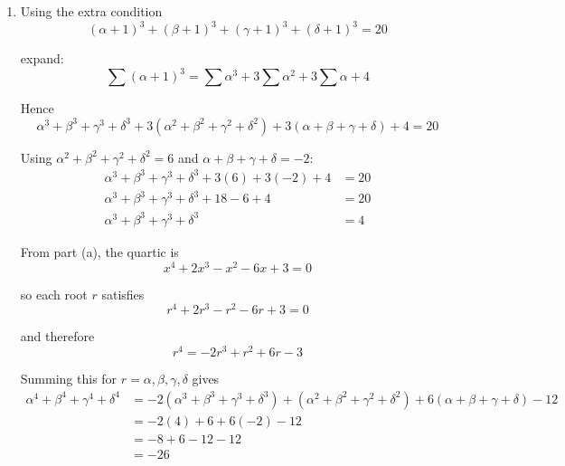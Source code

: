 \documentclass[leqno]{article}
\begin{document}
\begin{enumerate}[
  label=\textbf{\arabic*.},
  leftmargin=*,
  topsep=0pt,
  partopsep=0pt,
  parsep=0pt
]
\begin{djsSolution}
\begin{enumerate}[label=\textbf{(\alph*)}]
  since there are $4$ lots of $1^2$.

  Substituting \(\alpha+\beta+\gamma+\delta=-2\):
  \begin{align*}
  \alpha^2+\beta^2+\gamma^2+\delta^2+2(-2)+4&=6\\
  \alpha^2+\beta^2+\gamma^2+\delta^2&=6
  \end{align*}

  Also
  \[
  (\alpha+\beta+\gamma+\delta)^2
  =\alpha^2+\beta^2+\gamma^2+\delta^2+2(\alpha\beta+\alpha\gamma+\alpha\delta+\beta\gamma+\beta\delta+\gamma\delta)
  \]

  so
  \begin{align*}
  (-2)^2&=6+2c\\
  4&=6+2c\\
  2c&=-2\\
  c&=-1
  \end{align*}

  Therefore
  \[
  b=2,\qquad c=-1,\qquad d=-6
  \]

  \item Using the extra condition
  \[
  (\alpha+1)^3+(\beta+1)^3+(\gamma+1)^3+(\delta+1)^3=20
  \]

  expand:
  \[
  \sum(\alpha+1)^3=\sum\alpha^3+3\sum\alpha^2+3\sum\alpha+4
  \]

  Hence
  \[
  \alpha^3+\beta^3+\gamma^3+\delta^3+3(\alpha^2+\beta^2+\gamma^2+\delta^2)+3(\alpha+\beta+\gamma+\delta)+4=20
  \]

  Using \(\alpha^2+\beta^2+\gamma^2+\delta^2=6\) and \(\alpha+\beta+\gamma+\delta=-2\):
  \begin{align*}
  \alpha^3+\beta^3+\gamma^3+\delta^3+3(6)+3(-2)+4&=20\\
  \alpha^3+\beta^3+\gamma^3+\delta^3+18-6+4&=20\\
  \alpha^3+\beta^3+\gamma^3+\delta^3&=4
  \end{align*}

  From part (a), the quartic is
  \[
  x^4+2x^3-x^2-6x+3=0
  \]

  so each root $r$ satisfies
  \[
  r^4+2r^3-r^2-6r+3=0
  \]

  and therefore
  \[
  r^4=-2r^3+r^2+6r-3
  \]

  Summing this for $r=\alpha,\beta,\gamma,\delta$ gives
  \begin{align*}
  \alpha^4+\beta^4+\gamma^4+\delta^4
  &=-2(\alpha^3+\beta^3+\gamma^3+\delta^3)+(\alpha^2+\beta^2+\gamma^2+\delta^2)+6(\alpha+\beta+\gamma+\delta)-12\\
  &=-2(4)+6+6(-2)-12\\
  &=-8+6-12-12\\
  &=-26
  \end{align*}
\end{enumerate}
\end{djsSolution}



\end{enumerate}
\end{document}
